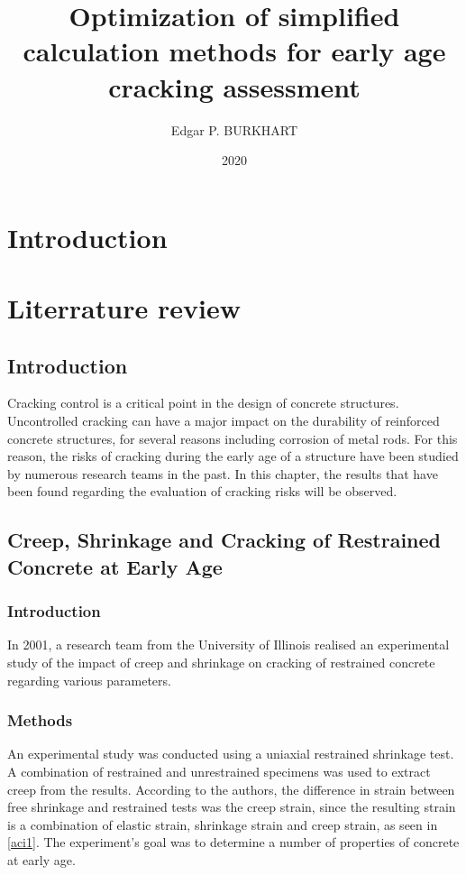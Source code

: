 \documentclass{memoir}
\title{Optimization of simplified calculation methods for early age cracking assessment}
\author{Edgar P. BURKHART}
\date{2020}
\begin{document}
\begin{titlingpage}
  \maketitle
\end{titlingpage}

\frontmatter
\tableofcontents
\listoffigures
\listoftables
\mainmatter

\chapter{Introduction}


\chapter{Literrature review}

\section{Introduction}

Cracking control is a critical point in the design of concrete structures.
Uncontrolled cracking can have a major impact on the durability of reinforced
concrete structures, for several reasons including corrosion of metal rods.
For this reason, the risks of cracking during the early age of a structure have
been studied by numerous research teams in the past. In this chapter, the
results that have been found regarding the evaluation of cracking risks will be
observed.

\section[Creep, Shrinkage and Cracking of Restrained Concrete at Early Age]
{Creep, Shrinkage and Cracking of Restrained Concrete at Early Age
\cite{cscea}}
\subsection{Introduction}
In 2001, a research team from the University of Illinois realised an
experimental study of the impact of creep and shrinkage on cracking of
restrained concrete regarding various parameters.

\subsection{Methods}
An experimental study was conducted using a uniaxial restrained shrinkage test.
A combination of restrained and unrestrained specimens was used to extract
creep from the results. According to the authors, the difference in strain
between free shrinkage and restrained tests was the creep strain, since the
resulting strain is a combination of elastic strain, shrinkage strain and creep
strain, as seen in
\autoref{aci1}. The experiment's goal was to determine a number of properties
of concrete at early age.
\end{document}
